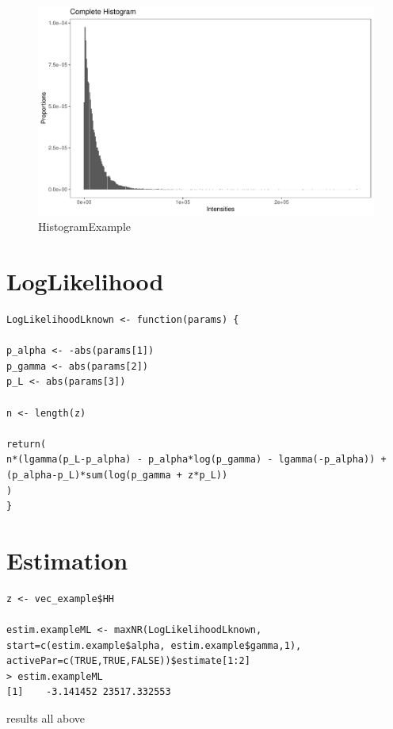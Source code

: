 \documentclass{article}
\begin{document}
\begin{figure}
	\centering
	\includegraphics[width=0.5\linewidth]{HistogramExample.pdf}
	\caption{HistogramExample}
	\label{fig:HistogramExample}
\end{figure}

\section{LogLikelihood}
\begin{lstlisting}[frame=tb]
LogLikelihoodLknown <- function(params) {

p_alpha <- -abs(params[1])
p_gamma <- abs(params[2])
p_L <- abs(params[3])

n <- length(z)

return(
n*(lgamma(p_L-p_alpha) - p_alpha*log(p_gamma) - lgamma(-p_alpha)) + 
(p_alpha-p_L)*sum(log(p_gamma + z*p_L)) 
)
}
\end{lstlisting}
\section{Estimation}
\begin{lstlisting}[frame=tb]
z <- vec_example$HH

estim.exampleML <- maxNR(LogLikelihoodLknown, 
start=c(estim.example$alpha, estim.example$gamma,1), 
activePar=c(TRUE,TRUE,FALSE))$estimate[1:2]
> estim.exampleML
[1]    -3.141452 23517.332553
\end{lstlisting}
results all above
\end{document}
